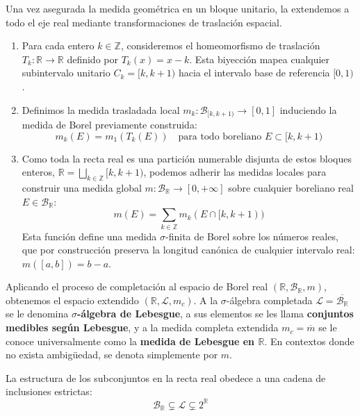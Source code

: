 Una vez asegurada la medida geométrica en un bloque unitario, la extendemos a todo el eje real mediante transformaciones de traslación espacial.
\begin{enumerate}[1)]
	\item Para cada entero $k \in \mathbb{Z}$, consideremos el homeomorfismo de traslación $T_k: \mathbb{R} \to \mathbb{R}$ definido por $T_k(x) = x - k$. Esta biyección mapea cualquier subintervalo unitario $C_k = [k, k+1)$ hacia el intervalo base de referencia $[0,1)$.
	\item Definimos la medida trasladada local $m_k: \mathcal{B}_{[k, k+1)} \to [0, 1]$ induciendo la medida de Borel previamente construida:
	$$ m_k(E) = m_1(T_k(E)) \quad \text{para todo boreliano } E \subset [k, k+1) $$
	\item Como toda la recta real es una partición numerable disjunta de estos bloques enteros, $\mathbb{R} = \bigsqcup_{k \in \mathbb{Z}} [k, k+1)$, podemos adherir las medidas locales para construir una medida global $m: \mathcal{B}_\mathbb{R} \to [0, +\infty]$ sobre cualquier boreliano real $E \in \mathcal{B}_\mathbb{R}$:
	$$ m(E) = \sum_{k \in \mathbb{Z}} m_k(E \cap [k, k+1)) $$
	Esta función define una medida $\sigma$-finita de Borel sobre los números reales, que por construcción preserva la longitud canónica de cualquier intervalo real: $m([a,b]) = b - a$.
\end{enumerate}

\begin{definicion}
	Aplicando el proceso de completación al espacio de Borel real $(\mathbb{R}, \mathcal{B}_\mathbb{R}, m)$, obtenemos el espacio extendido $(\mathbb{R}, \mathcal{L}, m_c)$. A la $\sigma$-álgebra completada $\mathcal{L} = \overline{\mathcal{B}_\mathbb{R}}$ se le denomina \textbf{$\sigma$-álgebra de Lebesgue}, a sus elementos se les llama \textbf{conjuntos medibles según Lebesgue}, y a la medida completa extendida $m_c = \overline{m}$ se le conoce universalmente como la \textbf{medida de Lebesgue en $\mathbb{R}$}. En contextos donde no exista ambigüedad, se denota simplemente por $m$.
\end{definicion}

\begin{proposicion}
	La estructura de los subconjuntos en la recta real obedece a una cadena de inclusiones estrictas:
	$$ \mathcal{B}_\mathbb{R} \subsetneq \mathcal{L} \subsetneq 2^\mathbb{R} $$
\end{proposicion}

